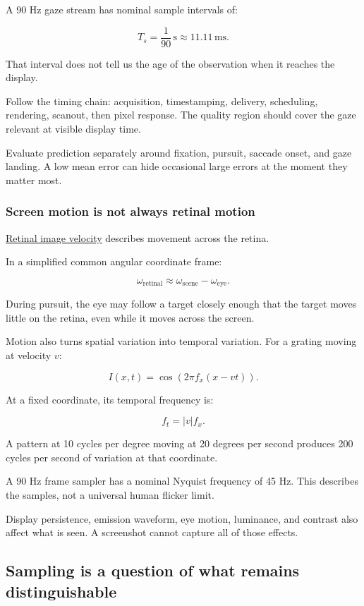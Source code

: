 A 90 Hz gaze stream has nominal sample intervals of:

\[
T_s=\frac1{90}\,\mathrm{s}\approx11.11\,\mathrm{ms}.
\]

That interval does not tell us the age of the observation when it reaches the display.

Follow the timing chain: acquisition, timestamping, delivery, scheduling, rendering, scanout, then pixel response. The quality region should cover the gaze relevant at visible display time.

Evaluate prediction separately around fixation, pursuit, saccade onset, and gaze landing. A low mean error can hide occasional large errors at the moment they matter most.

\subsubsection{Screen motion is not always retinal motion}\label{04-visual-computing-ii-ch043-screen-motion-is-not-always-retinal-motion}

\hyperref[appendix-70895739febb]{Retinal image velocity} describes movement across the retina.

In a simplified common angular coordinate frame:

\[
\omega_{\mathrm{retinal}}
\approx\omega_{\mathrm{scene}}-\omega_{\mathrm{eye}}.
\]

During pursuit, the eye may follow a target closely enough that the target moves little on the retina, even while it moves across the screen.

Motion also turns spatial variation into temporal variation. For a grating moving at velocity \(v\):

\[
I(x,t)=\cos\!\left(2\pi f_x(x-vt)\right).
\]

At a fixed coordinate, its temporal frequency is:

\[
f_t=|v|f_x.
\]

A pattern at 10 cycles per degree moving at 20 degrees per second produces 200 cycles per second of variation at that coordinate.

A 90 Hz frame sampler has a nominal Nyquist frequency of 45 Hz. This describes the samples, not a universal human flicker limit.

Display persistence, emission waveform, eye motion, luminance, and contrast also affect what is seen. A screenshot cannot capture all of those effects.

\subsection{Sampling is a question of what remains distinguishable}\label{04-visual-computing-ii-ch043-sampling-is-a-question-of-what-remains-distinguishable}

